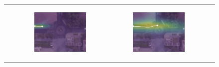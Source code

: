 \documentclass[letterpaper,10pt,conference]{ieeeconf}
\begin{document}
\begin{figure}
	\centering
	\begin{tabular}{M{.1\linewidth}  M{.3\linewidth} M{.3\linewidth}  M{.3\linewidth}} 

	  & \begin{subfigure}[b]{\linewidth}
		\includegraphics[width=\linewidth]{./figures/comparison/ours_death_1_2_t=70.png}
	\end{subfigure} &
	\begin{subfigure}[b]{\linewidth}
		\includegraphics[width=\linewidth]{./figures/comparison/ours_death_1_2_t=250.png}
	\end{subfigure} &

\end{tabular}
\end{figure}
\end{document}
